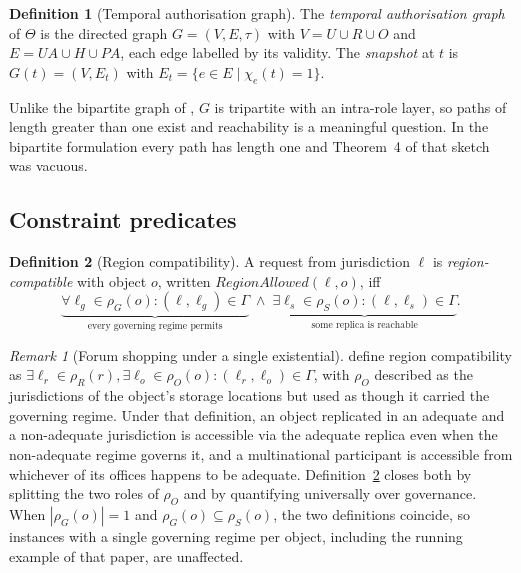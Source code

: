 \documentclass[11pt]{article}
\theoremstyle{definition}
\newtheorem{definition}{Definition}
\theoremstyle{plain}
\theoremstyle{remark}
\newtheorem{remark}{Remark}
\newcommand{\RegionOK}{\mathit{RegionAllowed}}
\begin{document}
\begin{definition}[Temporal authorisation graph]
The \emph{temporal authorisation graph} of $\Theta$ is the directed graph
$G = (V, E, \tau)$ with $V = U \cup R \cup O$ and
$E = UA \cup H \cup PA$, each edge labelled by its validity. The
\emph{snapshot} at $t$ is $G(t) = (V, E_t)$ with
$E_t = \{ e \in E \mid \chi_e(t) = 1 \}$.
\end{definition}

Unlike the bipartite graph of \citet{kokash2026compliance}, $G$ is tripartite
with an intra-role layer, so paths of length greater than one exist and
reachability is a meaningful question. In the bipartite formulation every path
has length one and Theorem~4 of that sketch was vacuous.

\subsection{Constraint predicates}

\begin{definition}[Region compatibility]
\label{def:region}
A request from jurisdiction $\ell$ is \emph{region-compatible} with object $o$,
written $\RegionOK(\ell, o)$, iff
\[
  \underbrace{\forall \ell_g \in \rho_G(o) : (\ell, \ell_g) \in \Gamma}
             _{\text{every governing regime permits}}
  \;\land\;
  \underbrace{\exists \ell_s \in \rho_S(o) : (\ell, \ell_s) \in \Gamma}
             _{\text{some replica is reachable}} .
\]
\end{definition}

\begin{remark}[Forum shopping under a single existential]
\label{rem:forum}
\citet{kokash2026compliance} define region compatibility as
$\exists \ell_r \in \rho_R(r), \exists \ell_o \in \rho_O(o) : (\ell_r, \ell_o)
\in \Gamma$, with $\rho_O$ described as the jurisdictions of the object's
storage locations but used as though it carried the governing regime. Under
that definition, an object replicated in an adequate and a non-adequate
jurisdiction is accessible via the adequate replica even when the non-adequate
regime governs it, and a multinational participant is accessible from whichever
of its offices happens to be adequate. Definition~\ref{def:region} closes both
by splitting the two roles of $\rho_O$ and by quantifying universally over
governance. When $|\rho_G(o)| = 1$ and $\rho_G(o) \subseteq \rho_S(o)$, the two
definitions coincide, so instances with a single governing regime per object,
including the running example of that paper, are unaffected.
\end{remark}
\end{document}
